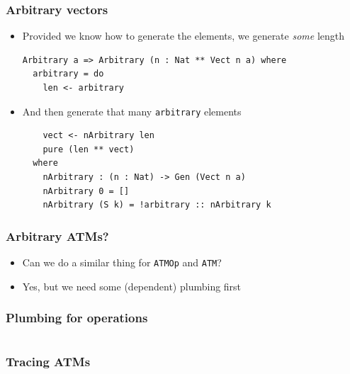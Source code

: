 \documentclass[compress,handout]{beamer}
\begin{document}
\begin{frame}[fragile]
  \frametitle{Arbitrary vectors}

  \begin{itemize}
  \item<1-> Provided we know how to generate the elements, we generate
            \textit{some} length
            \begin{verbatim}
Arbitrary a => Arbitrary (n : Nat ** Vect n a) where
  arbitrary = do
    len <- arbitrary
            \end{verbatim}
  \item<2-> And then generate that many \texttt{arbitrary}
            elements
            \begin{verbatim}
    vect <- nArbitrary len
    pure (len ** vect)
  where
    nArbitrary : (n : Nat) -> Gen (Vect n a)
    nArbitrary 0 = []
    nArbitrary (S k) = !arbitrary :: nArbitrary k
            \end{verbatim}
  \vspace*{-5mm}
  \end{itemize}

\end{frame}


\begin{frame}
  \frametitle{Arbitrary ATMs?}

  \begin{itemize}
    \item<1-> Can we do a similar thing for \texttt{ATMOp} and
              \texttt{ATM}?
    \item<2-> Yes, but we need some (dependent) plumbing first
  \end{itemize}

\end{frame}


\begin{frame}[fragile]
  \frametitle{Plumbing for operations}

  \inputminted{Idris}{qc-things/ATM-opres.idr}

\end{frame}


\begin{frame}[fragile]
  \frametitle{Tracing ATMs}

  \inputminted[fontsize=\footnotesize]{Idris}{qc-things/ATM-tracing.idr}

\end{frame}


\end{document}
